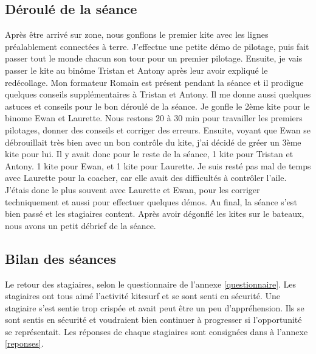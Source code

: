\documentclass[11pt,a4paper]{report}
\begin{document}
\subsection{Déroulé de la séance}
Après \^etre arrivé sur zone, nous gonflons le premier kite avec les
lignes préalablement connectées à terre. J'effectue une petite démo
de pilotage, puis fait passer tout le monde chacun son tour pour
un premier pilotage.
Ensuite, je vais passer le kite au binôme Tristan et Antony après leur
avoir expliqué le redécollage. Mon formateur Romain est présent pendant la
séance et il prodigue quelques conseils supplémentaires à Tristan et Antony.
Il me donne aussi quelques astuces et conseils pour le bon déroulé de
la séance.
Je gonfle le 2ème kite pour le binome Ewan et Laurette.
Nous restons 20 à 30 min pour travailler les premiers pilotages, donner des conseils 
et corriger des erreurs.
Ensuite, voyant que Ewan se débrouillait très bien avec un bon contrôle du 
kite, j'ai décidé de gréer un 3ème kite pour lui.
Il y avait donc pour le reste de la séance, 1 kite pour Tristan et Antony.
1 kite pour Ewan, et 1 kite pour Laurette. Je suis resté pas mal de temps
avec Laurette pour la coacher, car elle avait des difficultés à contrôler l'aile.
J'étais donc le plus souvent avec Laurette et Ewan, pour les corriger techniquement 
et aussi pour effectuer quelques démos.
Au final, la séance s'est bien passé et les stagiaires content.
Après avoir dégonflé les kites sur le bateaux, nous avons un petit débrief de la séance.



\subsection{Bilan des séances}
Le retour des stagiaires, selon le questionnaire de l'annexe \ref{questionnaire}.
Les stagiaires ont tous aimé l'activité kitesurf et se sont senti en sécurité.
Une stagiaire s'est sentie trop crispée et avait peut \^etre un peu d'appréhension.
Ils se sont sentis en sécurité
et voudraient bien continuer à progresser si l'opportunité se représentait.
Les réponses de chaque stagiaires sont consignées dans à l'annexe \ref{reponses}.
\end{document}
